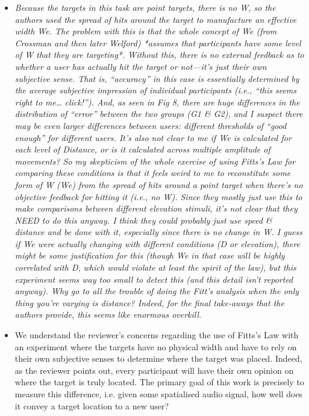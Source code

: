 \documentclass{scrartcl}
\begin{document}
\begin{itemize}
  \item \textit{Because the targets in this task are point targets, there is no W, so the authors used the spread of hits around the target to manufacture an effective width We. The problem with this is that the whole concept of We (from Crossman and then later Welford) *assumes that participants have some level of W that they are targeting*. Without this, there is no external feedback as to whether a user has actually hit the target or not—it’s just their own subjective sense. That is, “accuracy” in this case is essentially determined by the average subjective impression of individual participants (i.e., “this seems right to me… click!”). And, as seen in Fig 8, there are huge differences in the distribution of “error” between the two groups (G1 \& G2), and I suspect there may be even larger differences between users: different thresholds of “good enough” for different users. It’s also not clear to me if We is calculated for each level of Distance, or is it calculated across multiple amplitude of movements?
    So my skepticism of the whole exercise of using Fitts’s Law for comparing these conditions is that it feels weird to me to reconstitute some form of W (We) from the spread of hits around a point target when there’s no objective feedback for hitting it (i.e., no W). Since they mostly just use this to make comparisons between different elevation stimuli, it’s not clear that they NEED to do this anyway. I think they could probably just use speed \& distance and be done with it, especially since there is no change in W. I guess if We were actually changing with different conditions (D or elevation), there might be some justification for this (though We in that case will be highly correlated with D, which would violate at least the spirit of the law), but this experiment seems way too small to detect this (and this detail isn’t reported anyway). Why go to all the trouble of doing the Fitt’s analysis when the only thing you’re varying is distance? Indeed, for the final take-aways that the authors provide, this seems like enormous overkill.}
  \item[] We understand the reviewer's concerns regarding the use of Fitts's Law with an experiment where the targets have no physical width and have to rely on their own subjective senses to determine where the target was placed. 
    Indeed, as the reviewer points out, every participant will have their own opinion on where the target is truly located.
    The primary goal of this work is precisely to measure this difference, i.e. given some spatialised audio signal, how well does it convey a target location to a new user?

\end{itemize}
\end{document}
